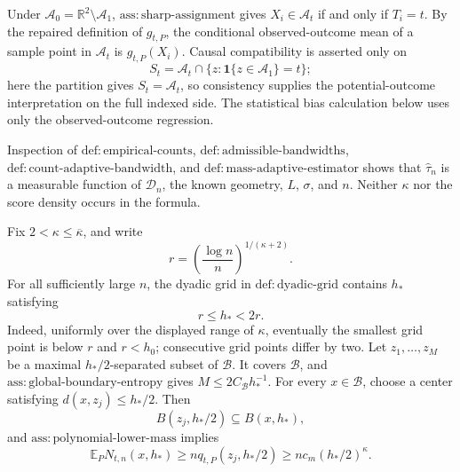 Under \(\mathcal A_0=\mathbb R^2\setminus\mathcal A_1\), \(\mathrm{ass:sharp\text{-}assignment}\) gives \(X_i\in\mathcal A_t\) if and only if \(T_i=t\).  By the repaired definition of \(g_{t,P}\), the conditional observed-outcome mean of a sample point in \(\mathcal A_t\) is \(g_{t,P}(X_i)\).  Causal compatibility is asserted only on
\[
 S_t=\mathcal A_t\cap\{z:\mathbf1\{z\in\mathcal A_1\}=t\};
\]
here the partition gives \(S_t=\mathcal A_t\), so consistency supplies the potential-outcome interpretation on the full indexed side.  The statistical bias calculation below uses only the observed-outcome regression.

Inspection of \(\mathrm{def:empirical\text{-}counts}\), \(\mathrm{def:admissible\text{-}bandwidths}\), \(\mathrm{def:count\text{-}adaptive\text{-}bandwidth}\), and \(\mathrm{def:mass\text{-}adaptive\text{-}estimator}\) shows that \(\widehat\tau_n\) is a measurable function of \(\mathcal D_n\), the known geometry, \(L\), \(\sigma\), and \(n\).  Neither \(\kappa\) nor the score density occurs in the formula.

Fix \(2<\kappa\le\overline\kappa\), and write
\[
 r=\left(\frac{\log n}{n}\right)^{1/(\kappa+2)}.
\]
For all sufficiently large \(n\), the dyadic grid in \(\mathrm{def:dyadic\text{-}grid}\) contains \(h_*\) satisfying
\[
 r\le h_*<2r. \tag{15}
\]
Indeed, uniformly over the displayed range of \(\kappa\), eventually the smallest grid point is below \(r\) and \(r<h_0\); consecutive grid points differ by two.  Let \(z_1,\ldots,z_M\) be a maximal \(h_*/2\)-separated subset of \(\mathcal B\).  It covers \(\mathcal B\), and \(\mathrm{ass:global\text{-}boundary\text{-}entropy}\) gives \(M\le2C_{\mathcal B}h_*^{-1}\).  For every \(x\in\mathcal B\), choose a center satisfying \(d(x,z_j)\le h_*/2\).  Then
\[
 B(z_j,h_*/2)\subseteq B(x,h_*),
\]
and \(\mathrm{ass:polynomial\text{-}lower\text{-}mass}\) implies
\[
 \mathbb E_PN_{t,n}(x,h_*)
 \ge n q_{t,P}(z_j,h_*/2)
 \ge nc_m(h_*/2)^\kappa. \tag{16}
\]

